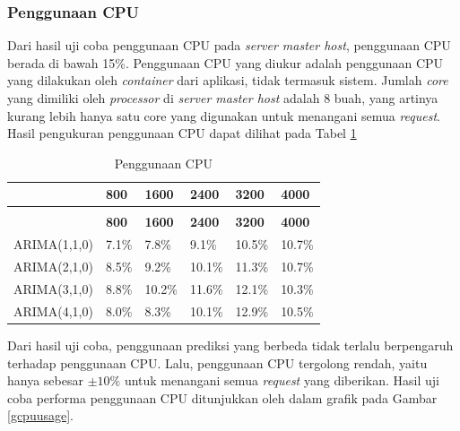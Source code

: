         \subsubsection{Penggunaan CPU}
        	Dari hasil uji coba penggunaan CPU pada \textit{server master host}, penggunaan CPU berada di bawah 15\%. Penggunaan CPU yang diukur adalah penggunaan CPU yang dilakukan oleh \textit{container} dari aplikasi, tidak termasuk sistem. Jumlah \textit{core} yang dimiliki oleh \textit{processor} di \textit{server master host} adalah 8 buah, yang artinya kurang lebih hanya satu core yang digunakan untuk menangani semua \textit{request}. Hasil pengukuran penggunaan CPU dapat dilihat pada Tabel \ref{penggunaancpu}
            
            \begin{longtable}{|p{}|p{}|p{}|p{}|p{}|p{}|}
        \caption{Penggunaan CPU} \label{penggunaancpu} \\
            \hline
            & \textbf{800} & \textbf{1600} & \textbf{2400} & \textbf{3200} & \textbf{4000} \\ \hline
            \endfirsthead
            \caption[]{Penggunaan CPU} \\
            \hline
            & \textbf{800} & \textbf{1600} & \textbf{2400} & \textbf{3200} & \textbf{4000} \\ \hline
            \endhead
            \endfoot
            \endlastfoot
			
            ARIMA(1,1,0) & 7.1\% & 7.8\% & 9.1\% & 10.5\% & 10.7\% \\ \hline
            ARIMA(2,1,0) & 8.5\% & 9.2\% & 10.1\% & 11.3\% & 10.7\% \\ \hline
            ARIMA(3,1,0) & 8.8\% & 10.2\% & 11.6\% & 12.1\% & 10.3\% \\ \hline
            ARIMA(4,1,0) & 8.0\% & 8.3\% & 10.1\% & 12.9\% & 10.5\% \\ \hline

		\end{longtable}
            
            Dari hasil uji coba, penggunaan prediksi yang berbeda tidak terlalu berpengaruh terhadap penggunaan CPU. Lalu, penggunaan CPU tergolong rendah, yaitu hanya sebesar $\pm 10 \%$ untuk menangani semua \textit{request} yang diberikan. Hasil uji coba performa penggunaan CPU ditunjukkan oleh dalam grafik pada Gambar \ref{gcpuusage}.
            
